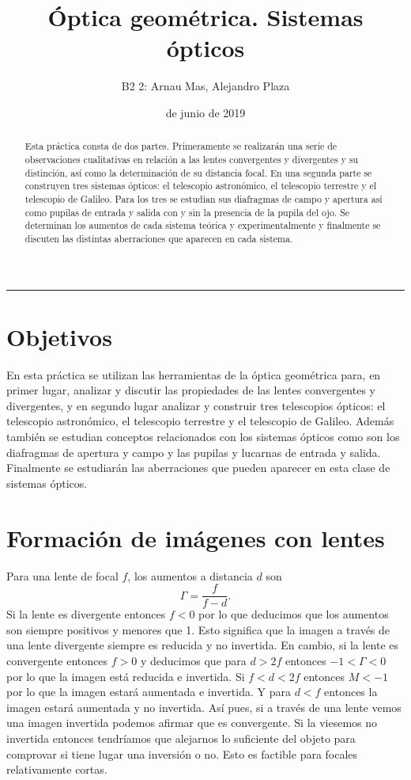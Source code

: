 \documentclass[12pt]{article}
\title{\sffamily {\bfseries Práctica 2:} Óptica geométrica. Sistemas ópticos }
\author{\sffamily B2 2: Arnau Mas, Alejandro Plaza}
\date{\sffamily 6 de junio de 2019}
\numberwithin{table}{section}
\numberwithin{figure}{section}
\numberwithin{equation}{section}
\begin{document}
\maketitle
\renewcommand{\abstractname}{\sffamily \bfseries Resumen:}
\begin{abstract}
	Esta práctica consta de dos partes. Primeramente se realizarán una serie de observaciones cualitativas en relación a las lentes convergentes y divergentes y su distinción, así como la determinación de su distancia focal. En una segunda parte se construyen tres sistemas ópticos: el telescopio astronómico, el telescopio terrestre y el telescopio de Galileo. Para los tres se estudian sus diafragmas de campo y apertura así como pupilas de entrada y salida con y sin la presencia de la pupila del ojo. Se determinan los aumentos de cada sistema teórica y experimentalmente y finalmente se discuten las distintas aberraciones que aparecen en cada sistema.
\end{abstract}
\hrule

\section{Objetivos}
En esta práctica se utilizan las herramientas de la óptica geométrica para, en primer lugar, analizar y discutir las propiedades de las lentes convergentes y divergentes, y en segundo lugar analizar y construir tres telescopios ópticos: el telescopio astronómico, el telescopio terrestre y el telescopio de Galileo. Además también se estudian conceptos relacionados con los sistemas ópticos como son los diafragmas de apertura y campo y las pupilas y lucarnas de entrada y salida. Finalmente se estudiarán las aberraciones que pueden aparecer en esta clase de sistemas ópticos.

\section{Formación de imágenes con lentes}
Para una lente de focal \( f \), los aumentos a distancia \( d \) son
\begin{equation*}
	\Gamma = \frac{f}{f - d}.
\end{equation*}
Si la lente es divergente entonces \( f < 0 \) por lo que deducimos que los aumentos son siempre positivos y menores que 1. Esto significa que la imagen a través de una lente divergente siempre es reducida y no invertida. En cambio, si la lente es convergente entonces \( f > 0 \) y deducimos que para \( d > 2f \) entonces \( -1 < \Gamma < 0 \) por lo que la imagen está reducida e invertida. Si \( f < d < 2f \) entonces \( M  < -1 \) por lo que la imagen estará aumentada e invertida. Y para \( d < f \) entonces la imagen estará aumentada y no invertida. Así pues, si a través de una lente vemos una imagen invertida podemos afirmar que es convergente. Si la viesemos no invertida entonces tendríamos que alejarnos lo suficiente del objeto para comprovar si tiene lugar una inversión o no. Esto es factible para focales relativamente cortas.    
\end{document}
